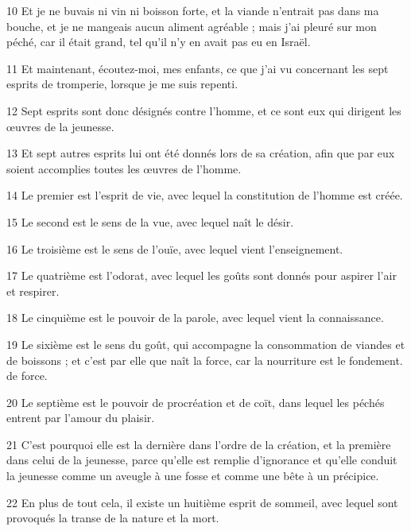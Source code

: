 \par 10 Et je ne buvais ni vin ni boisson forte, et la viande n'entrait pas dans ma bouche, et je ne mangeais aucun aliment agréable ; mais j'ai pleuré sur mon péché, car il était grand, tel qu'il n'y en avait pas eu en Israël.

\par 11 Et maintenant, écoutez-moi, mes enfants, ce que j'ai vu concernant les sept esprits de tromperie, lorsque je me suis repenti.

\par 12 Sept esprits sont donc désignés contre l'homme, et ce sont eux qui dirigent les œuvres de la jeunesse.

\par 13 Et sept autres esprits lui ont été donnés lors de sa création, afin que par eux soient accomplies toutes les œuvres de l'homme.

\par 14 Le premier est l'esprit de vie, avec lequel la constitution de l'homme est créée.

\par 15 Le second est le sens de la vue, avec lequel naît le désir.

\par 16 Le troisième est le sens de l'ouïe, avec lequel vient l'enseignement.

\par 17 Le quatrième est l'odorat, avec lequel les goûts sont donnés pour aspirer l'air et respirer.

\par 18 Le cinquième est le pouvoir de la parole, avec lequel vient la connaissance.

\par 19 Le sixième est le sens du goût, qui accompagne la consommation de viandes et de boissons ; et c'est par elle que naît la force, car la nourriture est le fondement. de force.

\par 20 Le septième est le pouvoir de procréation et de coït, dans lequel les péchés entrent par l'amour du plaisir.

\par 21 C'est pourquoi elle est la dernière dans l'ordre de la création, et la première dans celui de la jeunesse, parce qu'elle est remplie d'ignorance et qu'elle conduit la jeunesse comme un aveugle à une fosse et comme une bête à un précipice.

\par 22 En plus de tout cela, il existe un huitième esprit de sommeil, avec lequel sont provoqués la transe de la nature et la mort.

